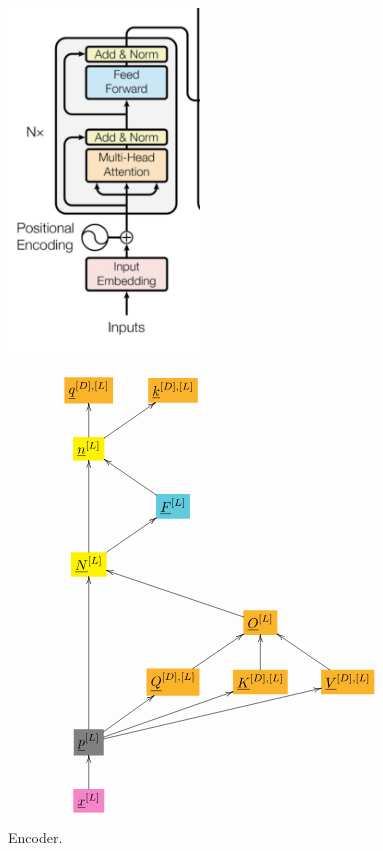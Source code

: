 \documentclass[12pt]{article}
\begin{document}
\begin{figure}[h!]\centering
\begin{minipage}{.5\linewidth}
\includegraphics[width=2in]{encoder.jpg}
\end{minipage}%
\begin{minipage}{.5\linewidth}
$$\xymatrix{
*+[F*:Dandelion]{\underline{q}^{[D], [L]}}&*+[F*:Dandelion]{\underline{k}^{[D], [L]}}&&
\\
*+[F*:yellow]{\underline{n}^{[L]}}\ar[u]\ar[ur]&&&
\\
&*+[F*:SkyBlue]{\underline{F}^{[L]}}\ar[ul]&&
\\
*+[F*:yellow]{\underline{N}^{[L]}}\ar[uu]\ar[ur]&&&
\\
&&*+[F*:Dandelion]{\underline{O}^{[L]}}\ar[ull]&
\\
&*+[F*:Dandelion]{\underline{Q}^{[D], [L]}}\ar[ur]&*+[F*:Dandelion]{\underline{K}^{[D], [L]}}\ar[u]&*+[F*:Dandelion]{\underline{V}^{[D],[L]}}\ar[ul]
\\
*+[F*:gray]{\underline{p}^{[L]}}\ar[uuu]\ar[ur]\ar[urr]\ar[urrr]&&&
\\
*+[F*:Lavender]{\underline{x}^{[L]}}\ar[u]&&&
}$$
\end{minipage}
\caption{Encoder.}
\label{fig-texnn-for-encoder}
\end{figure}
\end{document}
